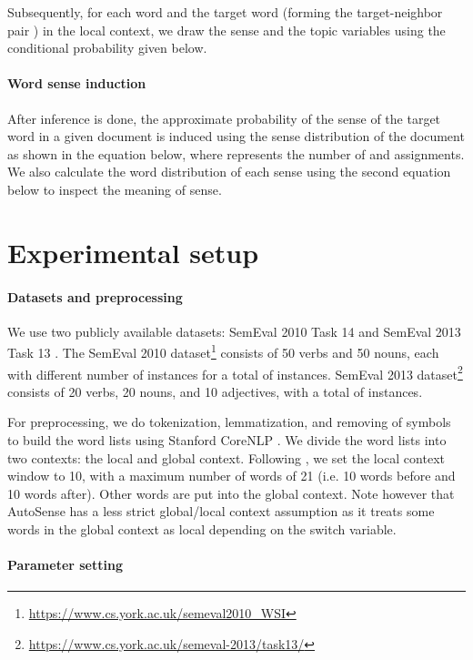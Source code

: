\documentclass[letterpaper]{article} \usepackage{aaai19}
\begin{document}
Subsequently, for each word  and the target word  (forming the target-neighbor pair ) in the local context, we draw the sense  and the topic  variables using the conditional probability given below.

\paragraph{Word sense induction}

After inference is done, the approximate probability of the sense  of the target word in a given document  is induced using the sense distribution of the document as shown in the equation below, where  represents the number of  and  assignments. We also calculate the word distribution of each sense using the second equation below to inspect the meaning of sense.

\section{Experimental setup} 

\paragraph{Datasets and preprocessing}

We use two publicly available datasets: SemEval 2010 Task 14 \cite{manandhar2010semeval} and SemEval 2013 Task 13 \cite{jurgens2013semeval}. The SemEval 2010 dataset\footnote{\url{https://www.cs.york.ac.uk/semeval2010_WSI}} consists of 50 verbs and 50 nouns, each with different number of instances for a total of  instances. SemEval 2013 dataset\footnote{\url{https://www.cs.york.ac.uk/semeval-2013/task13/}} consists of 20 verbs, 20 nouns, and 10 adjectives, with a total of  instances.

For preprocessing, we do tokenization, lemmatization, and removing of symbols to build the word lists using Stanford CoreNLP \cite{manning2014stanford}. We divide the word lists into two contexts: the local and global context. Following \cite{wang2015sense}, we set the local context window to 10, with a maximum number of words of 21 (i.e. 10 words before and 10 words after). Other words are put into the global context. Note however that AutoSense has a less strict global/local context assumption as it treats some words in the global context as local depending on the switch variable.

\paragraph{Parameter setting}
\end{document}
